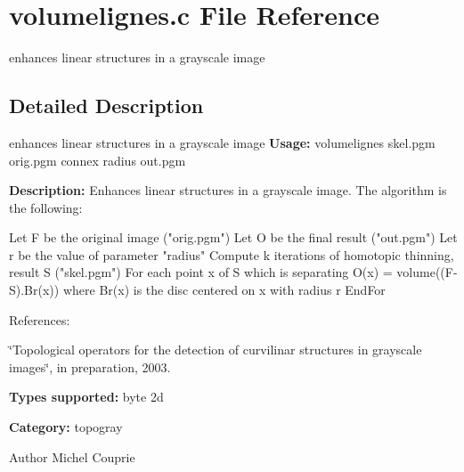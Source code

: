 \section{volumelignes.c File Reference}
\label{volumelignes_8c}


enhances linear structures in a grayscale image  




\subsection{Detailed Description}
enhances linear structures in a grayscale image {\bfseries Usage:} volumelignes skel.pgm orig.pgm connex radius out.pgm

{\bfseries Description:} Enhances linear structures in a grayscale image. The algorithm is the following:

\begin{DoxyVerb}
Let F be the original image ("orig.pgm")
Let O be the final result ("out.pgm")
Let r be the value of parameter "radius"
Compute k iterations of homotopic thinning, result S ("skel.pgm")
For each point x of S which is separating
  O(x) = volume((F-S).Br(x)) 
  where Br(x) is the disc centered on x with radius r
EndFor
\end{DoxyVerb}


References:\par
 \char`\"{}Topological operators for the detection of
curvilinar structures in grayscale images\char`\"{}, in preparation, 2003.

{\bfseries Types supported:} byte 2d

{\bfseries Category:} topogray

\begin{DoxyAuthor}{Author}
Michel Couprie 
\end{DoxyAuthor}
